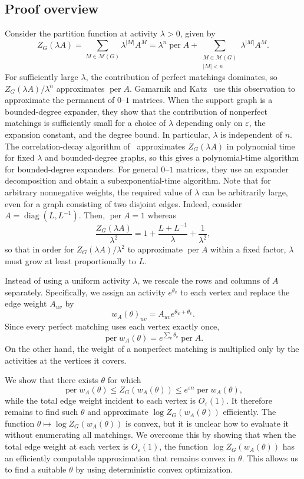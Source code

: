 \documentclass[11pt,reqno,letterpaper]{amsart}
\numberwithin{equation}{section}
\theoremstyle{definition}
\theoremstyle{remark}
\newcommand{\on}{\operatorname}
\newcommand{\cM}{\mathcal M}
\DeclareMathOperator{\per}{per}
\begin{document}
\subsection{Proof overview}\label{sec:overview}
Consider the partition function at activity $\lambda > 0$, given by
\[
 Z_G(\lambda A)
 =\sum_{M\in\cM(G)}\lambda^{|M|}A^M
 =\lambda^n\per A
  +\sum_{\substack{M\in\cM(G)\\ |M|<n}}
    \lambda^{|M|}A^M.
\]
For sufficiently large $\lambda$, the contribution of perfect
matchings dominates, so $Z_G(\lambda A)/\lambda^n$ approximates
$\per A$. Gamarnik and Katz~\cite{GK} use this observation to
approximate the permanent of $0$--$1$ matrices. When the support
graph is a bounded-degree expander, they show that the contribution
of nonperfect matchings is sufficiently small for a choice of
$\lambda$ depending only on $\varepsilon$, the expansion constant,
and the degree bound. In particular, $\lambda$ is independent of $n$.
The correlation-decay algorithm of~\cite{BGKNT} approximates
$Z_G(\lambda A)$ in polynomial time for fixed $\lambda$ and
bounded-degree graphs, so this gives a polynomial-time algorithm
for bounded-degree expanders. For general $0$--$1$ matrices,
they use an expander decomposition and obtain a
subexponential-time algorithm. Note that for arbitrary nonnegative weights, the required value of $\lambda$
can be arbitrarily large, even for a graph consisting of two disjoint edges. Indeed, consider $A=\operatorname{diag}(L,L^{-1})$. Then, $\on {per}A = 1$ whereas
\[
 \frac{Z_G(\lambda A)}{\lambda^2}
 =1+\frac{L+L^{-1}}{\lambda}+\frac{1}{\lambda^2},
\]
so that in order for $Z_G(\lambda A)/\lambda^2$ to approximate
$\per A$ within a fixed factor, $\lambda$ must grow at least
proportionally to $L$.

Instead of using a uniform activity $\lambda$, we rescale the rows and columns of $A$
separately. Specifically, we assign an activity $e^{\theta_v}$ to each vertex
and replace the edge weight $A_{uv}$ by
\[
 w_A(\theta)_{uv}=A_{uv}e^{\theta_u+\theta_v}.
\]
Since every perfect matching uses each vertex exactly once, 
\[
 \per w_A(\theta)
 =e^{\sum_v\theta_v}\per A.
\]
On the other hand, the weight of a nonperfect matching is multiplied only by the
activities at the vertices it covers. 

We show that there exists $\theta$ for which
\[
 \per w_A(\theta)
 \le Z_G(w_A(\theta))
 \le e^{\varepsilon n}\per w_A(\theta),
\]
while the total edge weight incident to each vertex is
$O_\varepsilon(1)$. It therefore remains to find such $\theta$
and approximate $\log Z_G(w_A(\theta))$ efficiently. The function $\theta\mapsto\log Z_G(w_A(\theta))$ is convex, but it is unclear how to evaluate it without 
enumerating all
matchings. We overcome this by showing that when the total edge weight at each
vertex is $O_\varepsilon(1)$, the function $\log Z_G(w_A(\theta))$ has an efficiently
computable approximation that remains convex in $\theta$. This allows us to find a suitable $\theta$ by using deterministic convex optimization.
\end{document}
